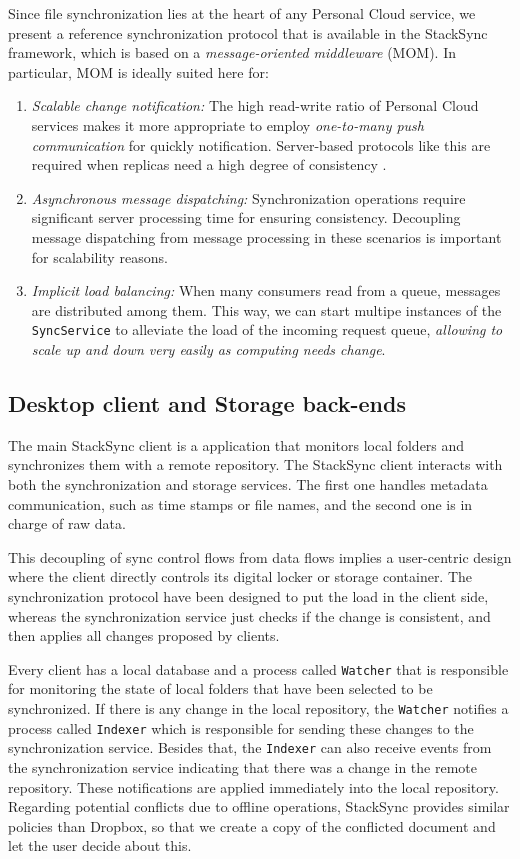 Since file synchronization lies at the heart of any Personal Cloud service, 
we present a reference synchronization protocol that is available in the StackSync framework,
which is based on a \textit{message-oriented middleware} (MOM). In particular, 
MOM is ideally suited here for:

\begin{enumerate}
\item \textit{Scalable change notification:} The high read-write ratio of Personal Cloud services makes
it more appropriate to employ \textit{one-to-many push communication} for quickly notification.  
Server-based protocols like this are required when replicas need a high degree of consistency \cite{Tanenbaum:2001:DSP:559404}.
\item \textit{Asynchronous message dispatching:}  Synchronization operations require significant
server processing time for ensuring consistency. Decoupling message dispatching from message
processing in these scenarios  \cite{menasce2005mom} is important for scalability reasons.
\item \textit{Implicit load balancing:} When many consumers read from a queue, messages are
distributed among them. This way, we can start multipe
instances of the \texttt{SyncService} to alleviate the load of the incoming request queue,
\textit{allowing to scale up and down very easily as computing needs change}.
\end{enumerate}


\subsection{Desktop client and Storage back-ends}

The main StackSync client is a application that monitors local folders and synchronizes them with a remote repository. The StackSync client interacts with both the synchronization and storage services. The first one handles metadata communication, such as time stamps or file names, and the second one is in charge of raw data.


This decoupling of sync control flows from data flows implies a user-centric design where the client directly controls its digital locker or storage container. The synchronization protocol have been designed to put the load in the client side, whereas the synchronization service just
checks if the change is consistent, and then applies all changes proposed by clients.


Every client has a local database and a process called \texttt{Watcher} that is responsible for monitoring the state of local folders that have been selected to be synchronized. If there is any change in the local repository, the \texttt{Watcher} notifies a process called \texttt{Indexer} which is responsible for sending these changes to the synchronization service. Besides that, the \texttt{Indexer} can also receive events from the synchronization service indicating that there was a change in the remote repository. These notifications are applied immediately into the local repository. Regarding potential
conflicts due to offline operations, StackSync provides similar policies than Dropbox, so that we create a copy of the conflicted document and let the user decide about this.


